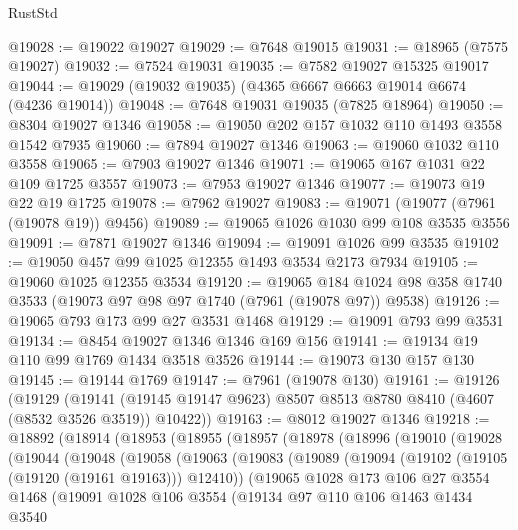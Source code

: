 \begin{lexlean}{RustStd}
\begin{coremodule}
@19028 := @19022 @19027
@19029 := @7648 @19015
@19031 := @18965 (@7575 @19027)
@19032 := @7524 @19031
@19035 := @7582 @19027 @15325 @19017
@19044 := @19029 (@19032 @19035) (@4365 @6667 @6663 @19014 @6674 (@4236 @19014))
@19048 := @7648 @19031 @19035 (@7825 @18964)
@19050 := @8304 @19027 @1346
@19058 := @19050 @202 @157 @1032 @110 @1493 @3558 @1542 @7935
@19060 := @7894 @19027 @1346
@19063 := @19060 @1032 @110 @3558
@19065 := @7903 @19027 @1346
@19071 := @19065 @167 @1031 @22 @109 @1725 @3557
@19073 := @7953 @19027 @1346
@19077 := @19073 @19 @22 @19 @1725
@19078 := @7962 @19027
@19083 := @19071 (@19077 (@7961 (@19078 @19)) @9456)
@19089 := @19065 @1026 @1030 @99 @108 @3535 @3556
@19091 := @7871 @19027 @1346
@19094 := @19091 @1026 @99 @3535
@19102 := @19050 @457 @99 @1025 @12355 @1493 @3534 @2173 @7934
@19105 := @19060 @1025 @12355 @3534
@19120 := @19065
    @184
    @1024
    @98
    @358
    @1740
    @3533
    (@19073 @97 @98 @97 @1740 (@7961 (@19078 @97)) @9538)
@19126 := @19065 @793 @173 @99 @27 @3531 @1468
@19129 := @19091 @793 @99 @3531
@19134 := @8454 @19027 @1346 @1346 @169 @156
@19141 := @19134 @19 @110 @99 @1769 @1434 @3518 @3526
@19144 := @19073 @130 @157 @130
@19145 := @19144 @1769
@19147 := @7961 (@19078 @130)
@19161 := @19126
    (@19129
      (@19141 (@19145 @19147 @9623) @8507 @8513 @8780 @8410 (@4607 (@8532 @3526 @3519)) @10422))
@19163 := @8012 @19027 @1346
@19218 := @18892
    (@18914
      (@18953
        (@18955
          (@18957
            (@18978
              (@18996
                (@19010
                  (@19028
                    (@19044
                      (@19048
                        (@19058
                          (@19063
                            (@19083
                              (@19089
                                (@19094 (@19102 (@19105 (@19120 (@19161 @19163))) @12410))
                                (@19065
                                  @1028
                                  @173
                                  @106
                                  @27
                                  @3554
                                  @1468
                                  (@19091
                                    @1028
                                    @106
                                    @3554
                                    (@19134
                                      @97
                                      @110
                                      @106
                                      @1463
                                      @1434
                                      @3540

\end{coremodule}
\end{lexlean}
